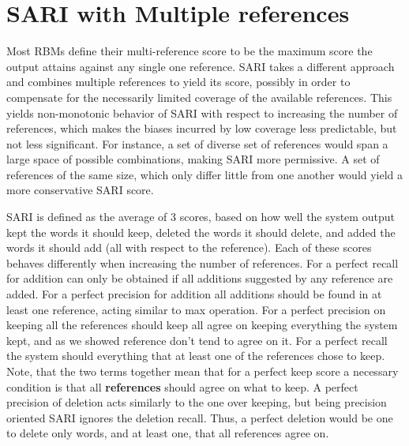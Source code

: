 \documentclass[letterpaper, 11pt]{article}
\begin{document}
\section{SARI with Multiple references}\label{ap:sari-assum}
Most RBMs define their multi-reference score to be the maximum score the
output attains against any single one reference.
SARI takes a different approach and combines multiple references to yield its score, 
possibly in order to compensate for the necessarily limited coverage of the available
references. This yields non-monotonic behavior of SARI with respect to increasing
the number of references, which makes the biases incurred by low coverage less predictable,
but not less significant.
For instance, a set of diverse set of references would span a large space of possible
combinations, making SARI more permissive. A set of references of the same size, which only differ little
from one another would yield a more conservative SARI score.

SARI is defined as the average of 3 scores, based on how well the system output kept the words it should keep,
deleted the words it should delete, and added the words it should add (all with respect to the reference).
Each of these scores behaves differently when increasing the number of references.
For a perfect recall for addition can only be obtained if all additions suggested by any reference are added. For a perfect precision for addition all additions should be found in at least one reference, acting similar to max operation. For a perfect precision on keeping all the references should keep all agree on keeping everything the system kept, and as we showed reference don't tend to agree on it. For a perfect recall the system should everything that at least one of the references chose to keep. Note, that the two terms together mean that for a perfect keep score a necessary condition is that all \textbf{references} should agree on what to keep. A perfect precision of deletion acts similarly to the one over keeping, but being precision oriented SARI ignores the deletion recall. Thus, a perfect deletion would be one to delete only words, and at least one, that all references agree on.
\end{document}
